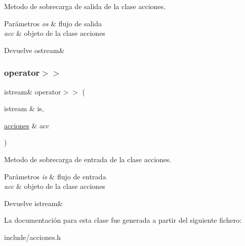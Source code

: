 Metodo de sobrecarga de salida de la clase acciones. 


\begin{DoxyParams}{Parámetros}
{\em os} & flujo de salida \\
\hline
{\em acc} & objeto de la clase acciones \\
\hline
\end{DoxyParams}
\begin{DoxyReturn}{Devuelve}
ostream\& 
\end{DoxyReturn}
\mbox{\label{classacciones_ae247268e2c115cf0e1a078adbbfc04bc}} 
\subsubsection{\texorpdfstring{operator$>$$>$}{operator>>}}
{\footnotesize\ttfamily istream\& operator$>$$>$ (\begin{DoxyParamCaption}\item[{istream \&}]{is,  }\item[{\hyperlink{classacciones}{acciones} \&}]{acc }\end{DoxyParamCaption})\hspace{0.3cm}{\ttfamily [friend]}}



Metodo de sobrecarga de entrada de la clase acciones. 


\begin{DoxyParams}{Parámetros}
{\em is} & flujo de entrada \\
\hline
{\em acc} & objeto de la clase acciones \\
\hline
\end{DoxyParams}
\begin{DoxyReturn}{Devuelve}
istream\& 
\end{DoxyReturn}


La documentación para esta clase fue generada a partir del siguiente fichero\+:\begin{DoxyCompactItemize}
\item 
include/acciones.\+h\end{DoxyCompactItemize}
